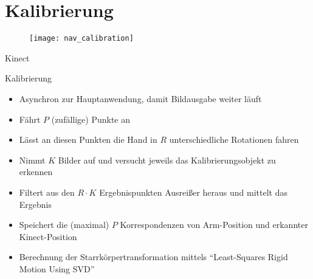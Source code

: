 
\section{Kalibrierung}

\begin{frame}[b]
	\begin{figure}
		\texttt{[image: nav\_calibration]}
	\end{figure}
	\vspace*{0.7cm}
\end{frame}

\begin{frame}[t]{Kinect}
	\begin{block}{Kalibrierung}
		\begin{itemize}
			\item Asynchron zur Hauptanwendung, damit Bildausgabe weiter läuft
			\item Fährt $P$ (zufällige) Punkte an
			\item Lässt an diesen Punkten die Hand in $R$ unterschiedliche
				Rotationen fahren
			\item Nimmt $K$ Bilder auf und versucht jeweils das
				Kalibrierungsobjekt zu erkennen
			\item Filtert aus den $R \cdot K$ Ergebnispunkten Ausreißer heraus
				und mittelt das Ergebnis
			\item Speichert die (maximal) $P$ Korrespondenzen von Arm-Position
				und erkannter Kinect-Position
			\item Berechnung der Starrkörpertransformation mittels
				\enquote{Least-Squares Rigid Motion Using SVD}
				\cite{sorkine2009lsrmusvd}
		\end{itemize}
	\end{block}
\end{frame}


